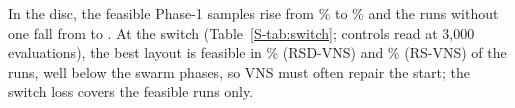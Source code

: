 In the disc, the feasible Phase-1 samples rise from \NRSPctFeasSamples\% to \NRSDPctFeasSamples\% and the runs without one fall from \NRSRunsNoFeasSample{} to \NRSDRunsNoFeasSample. At the switch (Table~\ref{S-tab:switch}; controls read at 3,000 evaluations), the best layout is feasible in \NSwitchFeasRSDVNS\% (RSD-VNS) and \NSwitchFeasRSVNS\% (RS-VNS) of the runs, well below the swarm phases, so VNS must often repair the start; the switch loss covers the feasible runs only.


